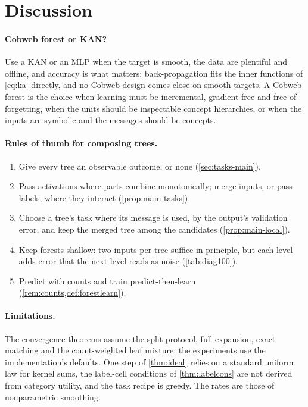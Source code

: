 \section{Discussion}\label{sec:discussion}

\paragraph{Cobweb forest or KAN?}
Use a KAN or an MLP when the target is smooth, the data are plentiful and offline, and
accuracy is what matters: back-propagation fits the inner functions of \eqref{eq:ka}
directly, and no Cobweb design comes close on smooth targets.  A Cobweb forest is the
choice when learning must be incremental, gradient-free and free of forgetting, when the
units should be inspectable concept hierarchies, or when the inputs are symbolic and the
messages should be concepts.

\paragraph{Rules of thumb for composing trees.}
\begin{enumerate}[leftmargin=*,noitemsep]
\item Give every tree an observable outcome, or none (\cref{sec:tasks-main}).
\item Pass activations where parts combine monotonically; merge inputs, or pass labels,
  where they interact (\cref{prop:main-tasks}).
\item Choose a tree's task where its message is used, by the output's validation error,
  and keep the merged tree among the candidates (\cref{prop:main-local}).
\item Keep forests shallow: two inputs per tree suffice in principle, but each level adds
  error that the next level reads as noise (\cref{tab:diag100}).
\item Predict with counts and train predict-then-learn (\cref{rem:counts,def:forestlearn}).
\end{enumerate}

\paragraph{Limitations.}
The convergence theorems assume the split protocol, full expansion, exact matching and
the count-weighted leaf mixture; the experiments use the implementation's defaults.  One
step of \cref{thm:ideal} relies on a standard uniform law for kernel sums, the label-cell
conditions of \cref{thm:labelcons} are not derived from category utility, and the task
recipe is greedy.  The rates are those of nonparametric smoothing.

\appendix
{}
